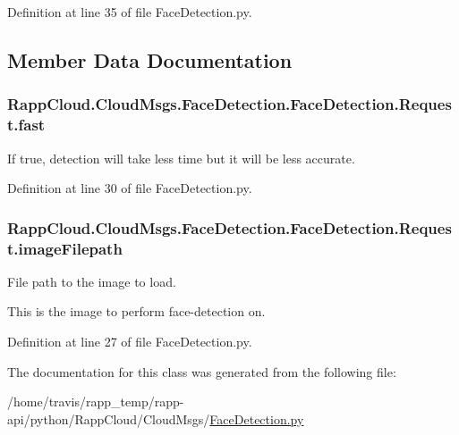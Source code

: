 Definition at line 35 of file Face\-Detection.\-py.



\subsection{Member Data Documentation}
\hypertarget{classRappCloud_1_1CloudMsgs_1_1FaceDetection_1_1FaceDetection_1_1Request_aa6fb29e9a44590fc56206af28ec0beda}{
\subsubsection[{fast}]{\setlength{\rightskip}{0pt plus 5cm}Rapp\-Cloud.\-Cloud\-Msgs.\-Face\-Detection.\-Face\-Detection.\-Request.\-fast}}\label{classRappCloud_1_1CloudMsgs_1_1FaceDetection_1_1FaceDetection_1_1Request_aa6fb29e9a44590fc56206af28ec0beda}


If true, detection will take less time but it will be less accurate. 



Definition at line 30 of file Face\-Detection.\-py.

\hypertarget{classRappCloud_1_1CloudMsgs_1_1FaceDetection_1_1FaceDetection_1_1Request_a680201dcc6a8cabb7d8d82439174ecb8}{
\subsubsection[{image\-Filepath}]{\setlength{\rightskip}{0pt plus 5cm}Rapp\-Cloud.\-Cloud\-Msgs.\-Face\-Detection.\-Face\-Detection.\-Request.\-image\-Filepath}}\label{classRappCloud_1_1CloudMsgs_1_1FaceDetection_1_1FaceDetection_1_1Request_a680201dcc6a8cabb7d8d82439174ecb8}


File path to the image to load. 

This is the image to perform face-\/detection on. 

Definition at line 27 of file Face\-Detection.\-py.



The documentation for this class was generated from the following file\-:\begin{DoxyCompactItemize}
\item 
/home/travis/rapp\-\_\-temp/rapp-\/api/python/\-Rapp\-Cloud/\-Cloud\-Msgs/\hyperlink{FaceDetection_8py}{Face\-Detection.\-py}\end{DoxyCompactItemize}
